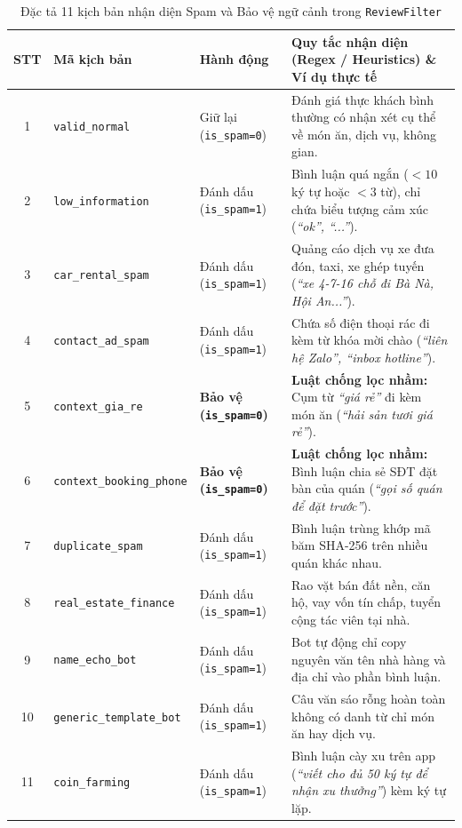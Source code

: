 \begin{table}[H]
\centering
\caption{Đặc tả 11 kịch bản nhận diện Spam và Bảo vệ ngữ cảnh trong \texttt{ReviewFilter}}
\label{tab:spam_cases}
\vspace{0.15cm}
\scriptsize
\begin{tabularx}{\textwidth}{c l l X}
\toprule
\rowcolor{blue!8}
\textbf{STT} & \textbf{Mã kịch bản} & \textbf{Hành động} & \textbf{Quy tắc nhận diện (Regex / Heuristics) \& Ví dụ thực tế} \\
\midrule
1 & \texttt{valid\_normal} & Giữ lại (\texttt{is\_spam=0}) & Đánh giá thực khách bình thường có nhận xét cụ thể về món ăn, dịch vụ, không gian. \\
2 & \texttt{low\_information} & Đánh dấu (\texttt{is\_spam=1}) & Bình luận quá ngắn ($< 10$ ký tự hoặc $< 3$ từ), chỉ chứa biểu tượng cảm xúc (\textit{``ok'', ``...''}). \\
3 & \texttt{car\_rental\_spam} & Đánh dấu (\texttt{is\_spam=1}) & Quảng cáo dịch vụ xe đưa đón, taxi, xe ghép tuyến (\textit{``xe 4-7-16 chỗ đi Bà Nà, Hội An...''}). \\
4 & \texttt{contact\_ad\_spam} & Đánh dấu (\texttt{is\_spam=1}) & Chứa số điện thoại rác đi kèm từ khóa mời chào (\textit{``liên hệ Zalo'', ``inbox hotline''}). \\
5 & \texttt{context\_gia\_re} & \textbf{Bảo vệ (\texttt{is\_spam=0})} & \textbf{Luật chống lọc nhầm:} Cụm từ \textit{``giá rẻ''} đi kèm món ăn (\textit{``hải sản tươi giá rẻ''}). \\
6 & \texttt{context\_booking\_phone} & \textbf{Bảo vệ (\texttt{is\_spam=0})} & \textbf{Luật chống lọc nhầm:} Bình luận chia sẻ SĐT đặt bàn của quán (\textit{``gọi số quán để đặt trước''}). \\
7 & \texttt{duplicate\_spam} & Đánh dấu (\texttt{is\_spam=1}) & Bình luận trùng khớp mã băm SHA-256 trên nhiều quán khác nhau. \\
8 & \texttt{real\_estate\_finance} & Đánh dấu (\texttt{is\_spam=1}) & Rao vặt bán đất nền, căn hộ, vay vốn tín chấp, tuyển cộng tác viên tại nhà. \\
9 & \texttt{name\_echo\_bot} & Đánh dấu (\texttt{is\_spam=1}) & Bot tự động chỉ copy nguyên văn tên nhà hàng và địa chỉ vào phần bình luận. \\
10 & \texttt{generic\_template\_bot} & Đánh dấu (\texttt{is\_spam=1}) & Câu văn sáo rỗng hoàn toàn không có danh từ chỉ món ăn hay dịch vụ. \\
11 & \texttt{coin\_farming} & Đánh dấu (\texttt{is\_spam=1}) & Bình luận cày xu trên app (\textit{``viết cho đủ 50 ký tự để nhận xu thưởng''}) kèm ký tự lặp. \\
\bottomrule
\end{tabularx}
\end{table}

